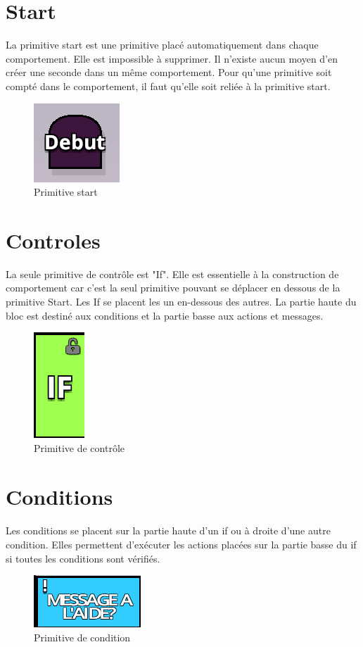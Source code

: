 \documentclass{report}
\begin{document}
\section{Start}
La primitive start est une primitive placé automatiquement dans chaque comportement. Elle est impossible à supprimer. Il n'existe aucun moyen d'en créer une seconde dans un même comportement. Pour qu'une primitive soit compté dans le comportement, il faut qu'elle soit reliée à la primitive start.
 \begin{figure}[!h]
	\centering
		\includegraphics[scale=1]{start.png}
	\caption{Primitive start}
\end{figure}
\section{Controles}
La seule primitive de contrôle est "If". Elle est essentielle à la construction de comportement car c'est la seul primitive pouvant se déplacer en dessous de la primitive Start.\newline
Les If se placent les un en-dessous des autres. La partie haute du bloc est destiné aux conditions et la partie basse aux actions et messages.
\begin{figure}[!h]
	\centering
		\includegraphics[scale=1]{if.png}
	\caption{Primitive de contrôle}
\end{figure}
\paragraph{}
\newpage
\section{Conditions}
\paragraph{}
Les conditions se placent sur la partie haute d'un if ou à droite d'une autre condition. Elles permettent d'exécuter les actions placées sur la partie basse du if si toutes les conditions sont vérifiés.
\begin{figure}[!h]
	\centering
		\includegraphics[scale=1]{cond.png}
	\caption{Primitive de condition}
\end{figure}
\end{document}
